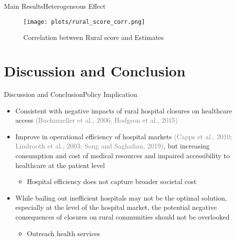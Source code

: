 \documentclass{beamer}
\theoremstyle{definition}
\begin{document}
\begin{frame}{Main Results}{Heterogeneous Effect}

\begin{figure}[t]
    \centering
    \texttt{[image: plots/rural\_score\_corr.png]}
    \caption{Correlation between Rural score and Estimates}
    \label{fig:rural_corr}
\end{figure}
\end{frame}




\section{Discussion and Conclusion}



\begin{frame}{Discussion and Conclusion}{Policy Implication}

\begin{itemize}
\setlength{\itemsep}{15pt}
    \item Consistent with negative impacts of rural hospital closures on healthcare access \textcolor{gray}{(Buchmueller et al., 2006; Hodgson et al., 2015)}
    \item Improve in operational efficiency of hospital markets \textcolor{gray}{(Capps et al., 2010; Lindrooth et al., 2003; Song and Saghafian, 2019)}, but increasing consumption and cost of medical resources and impaired accessibility to healthcare at the patient level
    \begin{itemize}
        \item Hospital efficiency does not capture broader societal cost
    \end{itemize}
    \item While bailing out inefficient hospitals may not be the optimal solution, especially at the level of the hospital market, the potential negative consequences of closures on rural communities should not be overlooked
    \begin{itemize}
        \item Outreach health services %
    \end{itemize}
\end{itemize} 
    
\end{frame}
\end{document}
